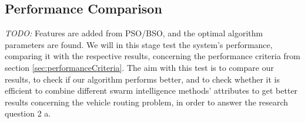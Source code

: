 \subsection{Performance Comparison}
\label{subsec:performanceComparison_plan}
\emph{\color{blue}TODO:} Features are added from PSO/BSO, and the optimal algorithm parameters are found. We will in this stage test the system's performance, comparing it with the respective results, concerning the performance criteria from section \vref{sec:performanceCriteria}. %
The aim with this test is to compare our results, to check if our algorithm performs better, and to check whether it is efficient to combine different swarm intelligence methods' attributes to get better results concerning the vehicle routing problem, in order to answer the research question 2 a.





